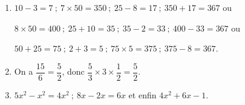 \begin{enumerate}
\item %
$10 - 3 = 7\:;\: 7 \times 50 = 350 \:;\: 25 - 8 = 17\:;\: 350 + 17 = 367$ ou

$8 \times 50 = 400\:;\: 25 + 10 = 35\:;\: 35 - 2 = 33\:;\: 400 - 33 = 367$ ou 

$50 + 25  = 75\:;\: 2 + 3 = 5\:;\: 75 \times 5 = 375\:;\: 375 - 8 = 367$. 
\item %

On a $\dfrac{15}{6} = \dfrac{5}{2}$, donc $\dfrac{5}{3} \times 3 \times \dfrac{1}{2} = \dfrac{5}{2}$.
 

\item %

$5x^2 - x^2 = 4x^2\:;\:8x - 2x = 6x$ et enfin $4x^2 + 6x - 1$.
\end{enumerate}

\vspace{0,5cm}


